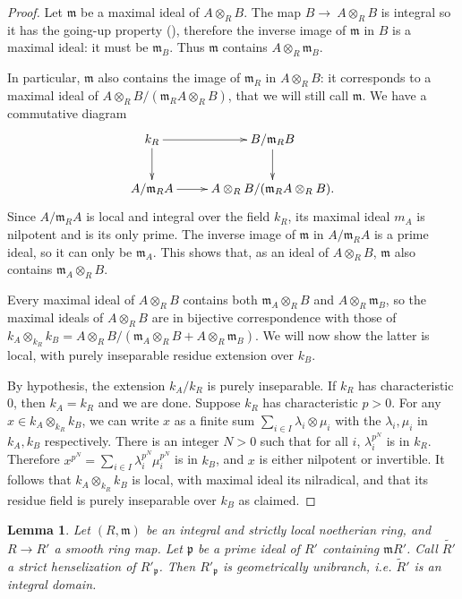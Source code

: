 \documentclass[a4paper,12pt]{amsart} %
\numberwithin{equation}{subsection}
\theoremstyle{definition}
\theoremstyle{plain}%
\newtheorem{lemma}[definition]{Lemma}
\theoremstyle{remark}
\begin{document}
\begin{proof}
Let $\mathfrak{m}$ be a maximal ideal of $A\otimes_R B$. The map $B\to~A\otimes_R B$ is integral so it has the going-up property (\cite[\href{https://stacks.math.columbia.edu/tag/00GU}{Tag 00GU}]{stacks-project}), therefore the inverse image of $\mathfrak{m}$ in $B$ is a maximal ideal: it must be $\mathfrak{m}_B$. Thus $\mathfrak{m}$ contains $A\otimes_R\mathfrak{m}_B$.

In particular, $\mathfrak{m}$ also contains the image of $\mathfrak{m}_R$ in $A\otimes_R B$: it corresponds to a maximal ideal of $A\otimes_R B/(\mathfrak{m}_R A\otimes_R B)$, that we will still call $\mathfrak{m}$. We have a commutative diagram
\[
\xymatrix{
k_R\ar[r]\ar[d]&B/\mathfrak{m}_R B\ar[d]\\
A/\mathfrak{m}_R A\ar[r]&A\otimes_R B/(\mathfrak{m}_R A\otimes_R B).
}
\]
Since $A/\mathfrak{m}_R A$ is local and integral over the field $k_R$, its maximal ideal $m_A$ is nilpotent and is its only prime. The inverse image of $\mathfrak{m}$ in $A/\mathfrak{m}_R A$ is a prime ideal, so it can only be $\mathfrak{m}_A$. This shows that, as an ideal of $A\otimes_R B$, $\mathfrak{m}$ also contains $\mathfrak{m}_A\otimes_R B$.

Every maximal ideal of $A\otimes_R B$ contains both $\mathfrak{m}_A\otimes_R B$ and $A\otimes_R\mathfrak{m}_B$, so the maximal ideals of $A\otimes_R B$ are in bijective correspondence with those of $k_A\otimes_{k_R} k_B=A\otimes_R B/(\mathfrak{m}_A\otimes_R B+A\otimes_R\mathfrak{m}_B)$. We will now show the latter is local, with purely inseparable residue extension over $k_B$.

By hypothesis, the extension $k_A/k_R$ is purely inseparable. If $k_R$ has characteristic $0$, then $k_A=k_R$ and we are done. Suppose $k_R$ has characteristic $p>0$. For any $x\in k_A\otimes_{k_R} k_B$, we can write $x$ as a finite sum $\sum\limits_{i\in I}\lambda_i\otimes\mu_i$ with the $\lambda_i,\mu_i$ in $k_A,k_B$ respectively. There is an integer $N>0$ such that for all $i$, $\lambda_i^{p^N}$ is in $k_R$. Therefore $x^{p^N}=\sum\limits_{i\in I}\lambda_i^{p^N}\mu_i^{p^N}$ is in $k_B$, and $x$ is either nilpotent or invertible. It follows that $k_A\otimes_{k_R} k_B$ is local, with maximal ideal its nilradical, and that its residue field is purely inseparable over $k_B$ as claimed.
\end{proof}

\begin{lemma}\label{lemme unibranche implique unibranche apres morphisme lisse local}
Let $(R,\mathfrak{m})$ be an integral and strictly local noetherian ring, and $R\to R'$ a smooth ring map. Let $\mathfrak{p}$ be a prime ideal of $R'$ containing $\mathfrak{m} R'$. Call $\tilde{R'}$ a strict henselization of $R'_\mathfrak{p}$. Then $R'_\mathfrak{p}$ is geometrically unibranch, i.e. $\tilde{R}'$ is an integral domain.
\end{lemma}
\end{document}
